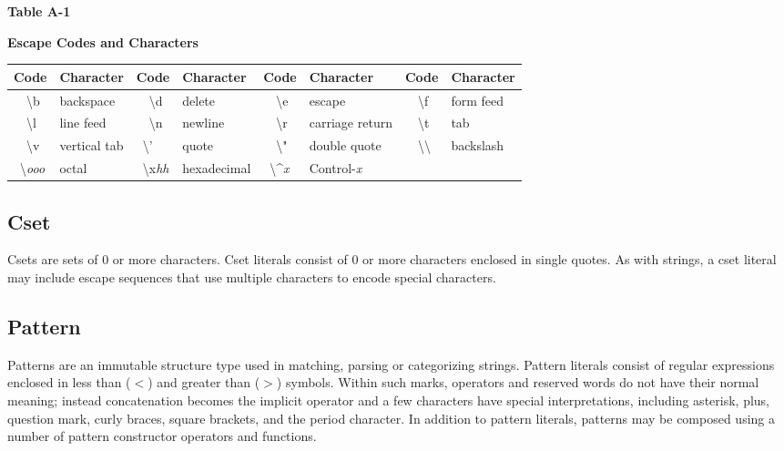 \begin{center}
{\sffamily\bfseries Table A-1}

{\sffamily\bfseries Escape Codes and Characters}
\end{center}

\begin{center}
\begin{xtabular}{|m{0.38in}|m{0.8in}|m{0.4in}|m{0.855in}|m{0.38in}|m{1.14in}|m{0.38in}|m{0.68in}|}
\hline
{\sffamily\bfseries Code} &
{\sffamily\bfseries Character} &
{\sffamily\bfseries Code} &
{\sffamily\bfseries Character} &
{\sffamily\bfseries Code} &
{\sffamily\bfseries Character} &
{\sffamily\bfseries Code} &
{\sffamily\bfseries Character}\\\hline
\ \ {\textbackslash}b & backspace &
\ \ {\textbackslash}d & delete &
\ \ {\textbackslash}e & escape &
\ \ {\textbackslash}f & form feed\\\hline
\ \ {\textbackslash}l & line feed &
\ \ {\textbackslash}n & newline &
\ \ {\textbackslash}r & carriage return &
\ \ {\textbackslash}t & tab\\\hline
\ \ {\textbackslash}v & vertical tab &
\ {\textbackslash}' & quote &
\ \ {\textbackslash}" & double quote &
\ \ {\textbackslash}{\textbackslash} & backslash\\\hline
\ {\textbackslash}\textit{ooo} & octal &
\ {\textbackslash}x\textit{hh} & hexadecimal  &
\ {\textbackslash}\^{}\textit{x} & Control-\textit{x} &
~
 &
~
\\\hline
\end{xtabular}
\end{center}


\subsection*{Cset}

Csets are sets of 0 or more characters. Cset literals
consist of 0 or more characters enclosed in single quotes. As with
strings, a cset literal may include escape
sequences that use multiple characters to encode special characters.

\subsection*{Pattern}

Patterns are an immutable structure type used in
matching, parsing or categorizing strings.  Pattern literals consist
of regular expressions enclosed in less than ($<$) and greater than
($>$) symbols. Within such marks, operators and reserved words do not
have their normal meaning; instead concatenation becomes the implicit
operator and a few characters have special interpretations, including
asterisk, plus, question mark, curly braces, square brackets, and the
period character.  In addition to pattern literals, patterns may be
composed using a number of pattern constructor operators and functions.

